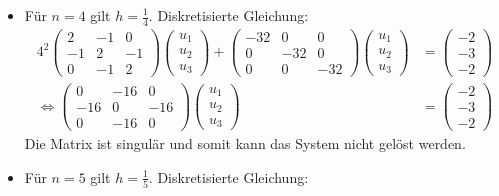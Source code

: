 \documentclass{exercise}
\begin{document}
\begin{itemize}
        \item Für \(n = 4\) gilt \(h = \frac{1}{4}\).
        Diskretisierte Gleichung:
        \begin{align*}
            4^2\begin{pmatrix}
                2 & -1 & 0\\
                -1 & 2 & -1\\
                0 & -1 & 2
            \end{pmatrix}\begin{pmatrix}
                u_1\\u_2\\u_3
            \end{pmatrix} + \begin{pmatrix}
                -32 & 0 & 0\\
                0 & -32 & 0\\
                0 & 0 & -32
            \end{pmatrix}\begin{pmatrix}
                u_1\\u_2\\u_3
            \end{pmatrix} &= \begin{pmatrix}
                -2\\-3\\-2
            \end{pmatrix}\\
            \iff \begin{pmatrix}
                0 & -16 & 0\\
                -16 & 0 & -16\\
                0 & -16 & 0
            \end{pmatrix}\begin{pmatrix}
                u_1\\u_2\\u_3
            \end{pmatrix} &= \begin{pmatrix}
                -2\\-3\\-2
            \end{pmatrix}
        \end{align*}
        Die Matrix ist singulär und somit kann das System nicht gelöst werden.
        \item Für \(n = 5\) gilt \(h = \frac{1}{5}\).
        Diskretisierte Gleichung:
        \begin{align*}

\end{align*}
\end{itemize}
\end{document}
